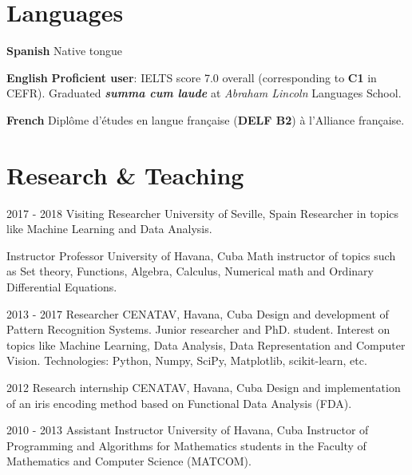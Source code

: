 \documentclass[]{friggeri-cv}
\begin{document}
\section{Languages}
\begin{entrylist}
  \entry
    {\textbf{Spanish}}
    {}
    {}
    {Native tongue}      

  \entry
    {\textbf{English}}
    {}
    {}
    {
    	\textbf{Proficient user}: IELTS score 7.0 overall (corresponding to \textbf{C1} in CEFR). 
    	Graduated \textbf{\emph{summa cum laude}} at \emph{Abraham Lincoln} Languages School.\\
    }

  \entry
    {\textbf{French}}
    {}
    {}
    {Diplôme d'études en langue française (\textbf{DELF B2}) à l'Alliance française.}
\end{entrylist}

\section{Research \& Teaching}
\begin{entrylist}
  \entry
    {2017 - 2018}
    {Visiting Researcher}
    {University of Seville, Spain}
    {Researcher in topics like Machine Learning and Data Analysis.\\}

  \entry
    {}
    {Instructor Professor}
    {University of Havana, Cuba}
    {Math instructor of topics such as Set theory, Functions, Algebra, Calculus, Numerical math and Ordinary Differential Equations.\\}

  \entry
    {2013 - 2017}
    {Researcher}
    {CENATAV, Havana, Cuba}
    {Design and development of Pattern Recognition Systems. Junior researcher and PhD. student. Interest on topics like Machine Learning, Data Analysis, Data Representation and Computer Vision. Technologies: Python, Numpy, SciPy, Matplotlib, scikit-learn, etc.\\}

  \entry
    {2012}
    {Research internship}
    {CENATAV, Havana, Cuba}
    {Design and implementation of an iris encoding method based on Functional Data Analysis (FDA).\\}
    
  \entry
    {2010 - 2013}
    {Assistant Instructor}
    {University of Havana, Cuba}
    {Instructor of Programming and Algorithms for Mathematics students in the Faculty of Mathematics and Computer Science (MATCOM).\\}
\end{entrylist}
\end{document}
